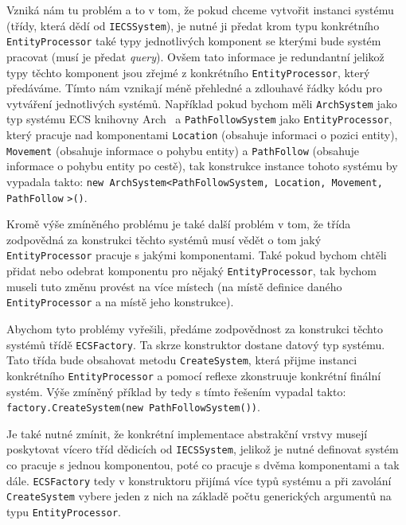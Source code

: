 Vzniká nám tu problém a to v tom, že pokud chceme vytvořit instanci systému (třídy, která dědí od \verb|IECSSystem|), je nutné ji předat krom typu konkrétního \verb|EntityProcessor| také typy jednotlivých komponent se kterými bude systém pracovat (musí je předat \textit{query}). Ovšem tato informace je redundantní jelikož typy těchto komponent jsou zřejmé z konkrétního \verb|EntityProcessor|, který předáváme. Tímto nám vznikají méně přehledné a zdlouhavé řádky kódu pro vytváření jednotlivých systémů. Například pokud bychom měli \verb|ArchSystem| jako typ systému ECS knihovny Arch~\cite{Arch} a \verb|PathFollowSystem| jako \verb|EntityProcessor|, který pracuje nad komponentami \verb|Location| (obsahuje informaci o pozici entity), \verb|Movement| (obsahuje informace o pohybu entity) a \verb|PathFollow| (obsahuje informace o pohybu entity po cestě), tak konstrukce instance tohoto systému by vypadala takto: \verb|new ArchSystem<PathFollowSystem, Location, Movement, PathFollow| \verb|>()|.

Kromě výše zmíněného problému je také další problém v tom, že třída zodpovědná za konstrukci těchto systémů musí vědět o tom jaký \verb|EntityProcessor| pracuje s jakými komponentami. Také pokud bychom chtěli přidat nebo odebrat komponentu pro nějaký \verb|EntityProcessor|, tak bychom museli tuto změnu provést na více místech (na místě definice daného \verb|EntityProcessor| a na místě jeho konstrukce).

Abychom tyto problémy vyřešili, předáme zodpovědnost za konstrukci těchto systémů třídě \verb|ECSFactory|. Ta skrze konstruktor dostane datový typ systému. Tato třída bude obsahovat metodu \verb|CreateSystem|, která přijme instanci konkrétního \verb|EntityProcessor| a pomocí reflexe zkonstruuje konkrétní finální systém. Výše zmíněný příklad by tedy s tímto řešením vypadal takto: \verb|factory.CreateSystem(new PathFollowSystem())|.

Je také nutné zmínit, že konkrétní implementace abstrakční vrstvy musejí poskytovat vícero tříd dědicích od \verb|IECSSystem|, jelikož je nutné definovat systém co pracuje s jednou komponentou, poté co pracuje s dvěma komponentami a tak dále. \verb|ECSFactory| tedy v konstruktoru přijímá více typů systému a při zavolání \verb|CreateSystem| vybere jeden z nich na základě počtu generických argumentů na typu \verb|EntityProcessor|.


